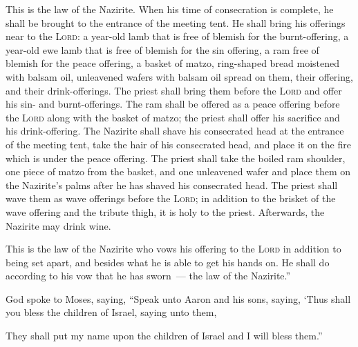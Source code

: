 \begin{inparaenum}
     This is the law of the Nazirite. When his time of consecration is complete, he shall be brought to the entrance of the meeting tent.%
     He shall bring his offerings near to the \textsc{Lord}: a year-old lamb that is free of blemish for the burnt-offering, a year-old ewe lamb that is free of blemish for the sin offering, a ram free of blemish for the peace offering,%
     a basket of matzo, ring-shaped bread moistened with balsam oil, unleavened wafers with balsam oil spread on them, their offering, and their drink-offerings.%
     The priest shall bring them before the \textsc{Lord} and offer his sin- and burnt-offerings.%
     The ram shall be offered as a peace offering before the \textsc{Lord} along with the basket of matzo; the priest shall offer his sacrifice and his drink-offering.%
     The Nazirite shall shave his consecrated head at the entrance of the meeting tent, take the hair of his consecrated head, and place it on the fire which is under the peace offering.%
     The priest shall take the boiled ram shoulder, one piece of matzo from the basket, and one unleavened wafer and place them on the Nazirite's palms after he has shaved his consecrated head.%
     The priest shall wave them as wave offerings before the \textsc{Lord}; in addition to the brisket of the wave offering and the tribute thigh, it is holy to the priest. Afterwards, the Nazirite may drink wine.%
    
     This is the law of the Nazirite who vows his offering to the \textsc{Lord} in addition to being set apart, and besides what he is able to get his hands on. He shall do according to his vow that he has sworn~--- the law of the Nazirite.''%
    
     God spoke to Moses, saying,%
     ``Speak unto Aaron and his sons, saying, `Thus shall you bless the children of Israel, saying unto them,%
    
    
    
    
     They shall put my name upon the children of Israel and I will bless them.''%
\end{inparaenum}
